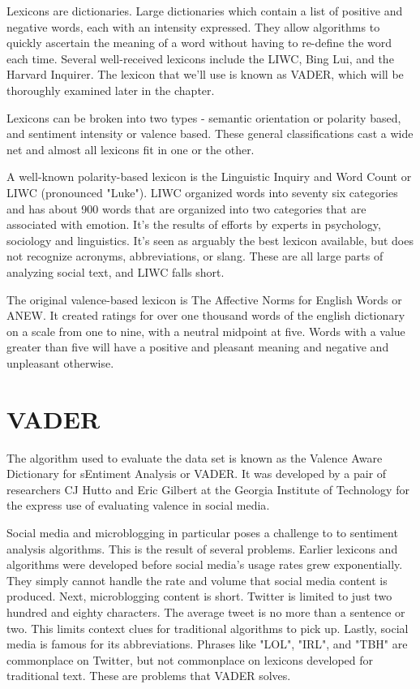 \documentclass[11pt, twoside, reqno]{book}
\begin{document}
Lexicons are dictionaries. Large dictionaries which contain a list of positive and negative words, each with an intensity expressed. They allow algorithms to quickly ascertain the meaning of a word without having to re-define the word each time. Several well-received lexicons include the LIWC, Bing Lui, and the Harvard Inquirer. The lexicon that we'll use is known as VADER, which will be thoroughly examined later in the chapter. 

Lexicons can be broken into two types - semantic orientation or polarity based, and sentiment intensity or valence based\cite{korhonen2009automatic}. These general classifications cast a wide net and almost all lexicons fit in one or the other. 

 A well-known polarity-based lexicon is the Linguistic Inquiry and Word Count or LIWC (pronounced "Luke")\cite{liwc}. LIWC organized words into seventy six categories and has about 900 words that are organized into two categories that are associated with emotion. It's the results of efforts by experts in psychology, sociology and linguistics. It's seen as arguably the best lexicon available, but does not recognize acronyms, abbreviations, or slang\cite{vader,liwc}. These are all large parts of analyzing social text, and LIWC falls short. 

The original valence-based lexicon is The Affective Norms for English Words or ANEW. It created ratings for over one thousand words of the english dictionary on a scale from one to nine, with a neutral midpoint at five. Words with a value greater than five will have a positive and pleasant meaning and negative and unpleasant otherwise\cite{anew}. 

\section{VADER}
\hspace{0.2in}The algorithm used to evaluate the data set is known as the Valence Aware Dictionary for sEntiment Analysis or VADER. It was developed by a pair of researchers CJ Hutto and Eric Gilbert at the Georgia Institute of Technology for the express use of evaluating valence in social media\cite{vader}. 

Social media and microblogging in particular poses a challenge to to sentiment analysis algorithms. This is the result of several problems. Earlier lexicons and algorithms were developed before social media's usage rates grew exponentially. They simply cannot handle the rate and volume that social media content is produced. Next, microblogging content is short. Twitter is limited to just two hundred and eighty characters. The average tweet is no more than a sentence or two. This limits context clues for traditional algorithms to pick up. Lastly, social media is famous for its abbreviations. Phrases like "LOL", "IRL", and "TBH" are commonplace on Twitter, but not commonplace on lexicons developed for traditional text. These are problems that VADER solves.
\end{document}
